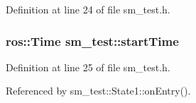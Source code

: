 Definition at line 24 of file sm\+\_\+test.\+h.

\subsubsection[{\texorpdfstring{start\+Time}{startTime}}]{\setlength{\rightskip}{0pt plus 5cm}ros\+::\+Time sm\+\_\+test\+::start\+Time}\hypertarget{namespacesm__test_aa99c742599f6e6c98f883ce4c03f743b}{}\label{namespacesm__test_aa99c742599f6e6c98f883ce4c03f743b}


Definition at line 25 of file sm\+\_\+test.\+h.



Referenced by sm\+\_\+test\+::\+State1\+::on\+Entry().

